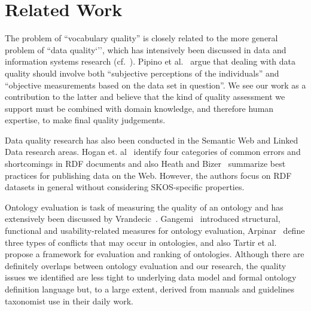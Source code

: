 \section{Related Work}\label{sec:related_work}


The problem of ``vocabulary quality'' is closely related to the more general problem of ``data quality`'', which has intensively been discussed in data and information systems research (cf.~\cite{Batini2009}). Pipino et al.~\cite{Pipino2002} argue that dealing with data quality should involve both ``subjective perceptions of the individuals'' and ``objective measurements based on the data set in question''. We see our work as a contribution to the latter and believe that the kind of quality assessment we support must be combined with domain knowledge, and therefore human expertise, to make final quality judgements.


Data quality research has also been conducted in the Semantic Web and Linked Data research areas. Hogan et. al~\cite{Hogan2010} identify four categories of common errors and shortcomings in RDF documents and also Heath and Bizer~\cite{Heath2011} summarize best practices for publishing data on the Web. However, the authors focus on RDF datasets in general without considering SKOS-specific properties. 


Ontology evaluation is task of measuring the quality of an ontology and has extensively been discussed by Vrandecic~\cite{Vrandecic2010}. Gangemi~\cite{Gangemi2006} introduced structural, functional and usability-related measures for ontology evaluation, Arpinar~\cite{Arpinar2006} define three types of conflicts that may occur in ontologies, and also Tartir et al.~\cite{Tartir2007} propose a framework for evaluation and ranking of ontologies. Although there are definitely overlaps between ontology evaluation and our research, the quality issues we identified are less tight to underlying data model and formal ontology definition language but, to a large extent, derived from manuals and guidelines taxonomist use in their daily work.
